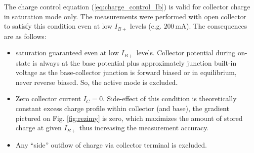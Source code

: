 \documentclass{eeict}
\newcommand{\un}[1]{\, \mathrm{#1}}	%
\begin{document}
The charge control equation (\ref{eq:charge_control_Ib}) is valid for collector charge in saturation mode only.
The measurements were performed with open collector to satisfy this condition even at low $I_{B+}$ levels (e.g. $200 \un{mA}$). The consequences are as follows:
\begin{itemize}
    \item saturation guaranteed even at low $I_{B+}$ levels. Collector potential during on-state is always at the base potential plus approximately junction built-in voltage as the base-collector junction is forward biased or in equilibrium, never reverse biased. So, the active mode is excluded.
    \item Zero collector current $I_C = 0$. Side-effect of this condition is theoretically constant excess charge profile within collector (and base), the gradient pictured on Fig. \ref{fig:rezimy} is zero, which maximizes the amount of stored charge at given $I_{B+}$ thus increasing the measurement accuracy.
    \item Any ``side'' outflow of charge via collector terminal is excluded.
\end{itemize}
\end{document}
